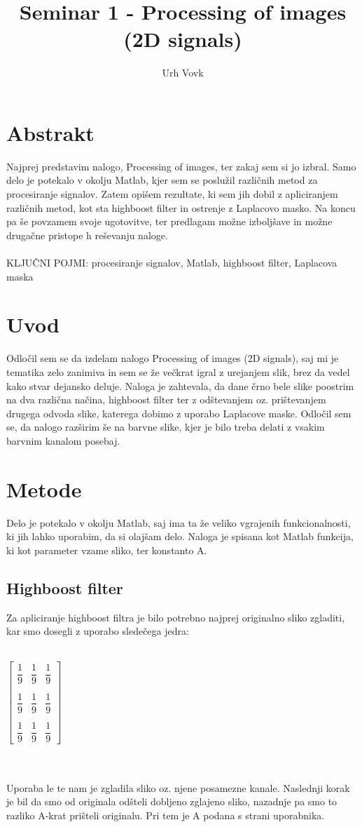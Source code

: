\documentclass{article}
\title{Seminar 1 - Processing of images (2D signals)}
\author{Urh Vovk}
\begin{document}
	\maketitle
	\section{Abstrakt}
	Najprej predstavim nalogo, Processing of images, ter 
	zakaj sem si jo izbral. Samo delo je potekalo v okolju Matlab, kjer sem se poslužil 
	različnih metod za procesiranje signalov. Zatem opišem rezultate, ki sem jih dobil 
	z apliciranjem različnih metod, kot sta highboost filter in ostrenje z Laplacovo masko.
	Na koncu pa še povzamem svoje ugotovitve, ter predlagam možne izboljšave in možne 			drugačne pristope h reševanju naloge.\\
	\\
	KLJUČNI POJMI: procesiranje signalov, Matlab, highboost filter, Laplacova maska
	
	\section{Uvod}
	Odločil sem se da izdelam nalogo Processing of images (2D signals), saj mi je tematika 
	zelo zanimiva in sem se že večkrat igral z urejanjem slik, brez da vedel kako stvar 
	dejansko deluje. Naloga je zahtevala, da dane črno bele slike poostrim na dva različna 		načina, highboost filter ter z odštevanjem oz. prištevanjem drugega odvoda slike, 			katerega dobimo z uporabo Laplacove maske. Odločil sem se, da nalogo razširim še na barvne slike, kjer je bilo treba delati z vsakim barvnim kanalom posebaj.
	\section{Metode}
	Delo je potekalo v okolju Matlab, saj ima ta že veliko vgrajenih funkcionalnosti, ki 		jih lahko uporabim, da si olajšam delo. Naloga je spisana kot Matlab funkcija, ki kot parameter vzame sliko, ter konstanto A.
	\subsection{Highboost filter}
	Za apliciranje highboost filtra je bilo potrebno najprej originalno sliko zgladiti, 		kar smo dosegli z uporabo sledečega jedra:  \\
	\\
	\centerline{$\begin{bmatrix}
	\dfrac{1}{9} & \dfrac{1}{9} & \dfrac{1}{9}\\
	\\
	\dfrac{1}{9} & \dfrac{1}{9} & \dfrac{1}{9}\\
	\\
	\dfrac{1}{9} & \dfrac{1}{9} & \dfrac{1}{9}
	\end{bmatrix}$}\\
	\\
	Uporaba le te nam je zgladila sliko oz. njene posamezne kanale. Naslednji korak je bil da smo od originala odšteli dobljeno zglajeno sliko, nazadnje pa smo to razliko A-krat prišteli originalu. Pri tem je A podana s strani uporabnika.
\end{document}
